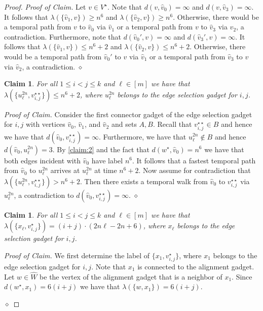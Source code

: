 \documentclass[11pt,a4paper]{article}
\newtheorem{claim}[theorem]{Claim}
\theoremstyle{remark}
\theoremstyle{definition}
\newenvironment{claimproof}{\noindent\emph{Proof of Claim.}}{\hfill$\diamond$

}
\begin{document}
\begin{proof}
\begin{claimproof}
%    
Let $v\in V^\star$. Note that $d(v,\hat{v}_0)=\infty$ and $d(v,\hat{v}_3)=\infty$. It follows that $\lambda(\{\hat{v}_1,v\})\ge n^6$ and $\lambda(\{\hat{v}_2,v\})\ge n^6$. Otherwise, there would be a temporal path from $v$ to $\hat{v}_0$ via $\hat{v}_1$ or a temporal path from $v$ to $\hat{v}_3$ via $\hat{v}_2$, a contradiction.
Furthermore, note that $d(\hat{v}_0',v)=\infty$ and $d(\hat{v}_3',v)=\infty$. It follows that $\lambda(\{\hat{v}_1,v\})\le n^6+2$ and $\lambda(\{\hat{v}_2,v\})\le n^6+2$. Otherwise, there would be a temporal path from $\hat{v}_0'$ to $v$ via $\hat{v}_1$ or a temporal path from $\hat{v}_3$ to $v$ via $\hat{v}_2$, a contradiction.
\end{claimproof}


\begin{claim}\label{claim:3}
    For all $1\le i<j\le k$ and $\ell\in[m]$ we have that $\lambda(\{u_\ell^{2n},v_{i,j}^{\star\star}\})\le n^6+2$, where $u_\ell^{2n}$ belongs to the edge selection gadget for $i,j$.
\end{claim}
\begin{claimproof}
    Consider the first connector gadget of the edge selection gadget for $i,j$ with vertices $\hat{v}_0$, $\hat{v}_1$, and $\hat{v}_2$ and sets $A,B$. Recall that $v_{i,j}^{\star\star}\in B$ and hence we have that $d(\hat{v}_0,v_{i,j}^{\star\star})=\infty$. Furthermore, we have that $u_\ell^{2n}\notin B$ and hence $d(\hat{v}_0,u_\ell^{2n})=3$. By \cref{claim:2} and the fact that $d(w^\star,\hat{v}_0)=n^6$ we have that both edges incident with $\hat{v}_0$ have label $n^6$. It follows that a fastest temporal path from $\hat{v}_0$ to $u_\ell^{2n}$ arrives at $u_\ell^{2n}$ at time $n^6+2$. Now assume for contradiction that $\lambda(\{u_\ell^{2n},v_{i,j}^{\star\star}\})> n^6+2$. Then there exists a temporal walk from $\hat{v}_0$ to $v_{i,j}^{\star\star}$ via $u_\ell^{2n}$, a contradiction to $d(\hat{v}_0,v_{i,j}^{\star\star})=\infty$.
\end{claimproof}

\begin{claim}\label{claim:4}
    For all $1\le i<j\le k$ and $\ell\in[m]$ we have that $\lambda(\{x_\ell,v_{i,j}^{\star}\})=(i+j)\cdot (2n\ell -2n+6)$, where $x_\ell$ belongs to the edge selection gadget for $i,j$.
\end{claim}
\begin{claimproof}
    We first determine the label of $\{x_1,v_{i,j}^{\star}\}$, where $x_1$ belongs to the edge selection gadget for $i,j$. Note that $x_1$ is connected to the alignment gadget. Let $w\in \hat{W}$ be the vertex of the alignment gadget that is a neighbor of $x_1$. Since $d(w^\star,x_1)=6(i+j)$ we have that $\lambda(\{w,x_1\})=6(i+j)$. 


\end{claimproof}
\end{proof}
\end{document}
